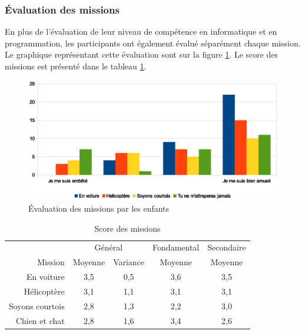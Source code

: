 \subsubsection{Évaluation des missions}
\label{appreciation}
En plus de l'évaluation de leur niveau de compétence en informatique et en programmation, les participants ont également évalué séparément chaque mission. Le graphique représentant cette évaluation sont sur la figure \ref{fig:evaluation-mission}. Le score des \glspl{mission} est présenté dans le tableau \ref{tab:form-missions}.
\begin{figure}
  \begin{center}
    \includegraphics[width=\textwidth]{content/8-validation/images/aimer}
    \caption{Évaluation des missions par les enfants}
    \label{fig:evaluation-mission}
  \end{center}
\end{figure}

\begin{table}
  \begin{center}
    \begin{tabular}{r|cc|c|c}
                       & \multicolumn{2}{c|}{Général} & Fondamental & Secondaire \\
      Mission          & Moyenne & Variance           & Moyenne     & Moyenne \\ \hline
      En voiture       & 3,5 & 0,5 & 3,6 & 3,5 \\
      Hélicoptère      & 3,1 & 1,1 & 3,1 & 3,1 \\
      Soyons courtois  & 2,8 & 1,3 & 2,2 & 3,0 \\
      Chien et chat    & 2,8 & 1,6 & 3,4 & 2,6 \\
    \end{tabular}
  \end{center}
  \caption{Score des missions}
  \label{tab:form-missions}
\end{table}

